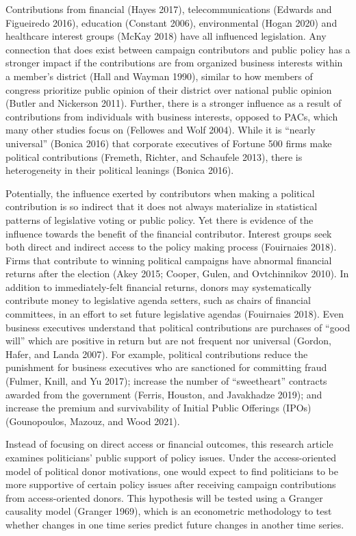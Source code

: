\documentclass[12pt,]{article}
\begin{document}
Contributions from financial (Hayes 2017), telecommunications (Edwards
and Figueiredo 2016), education (Constant 2006), environmental (Hogan
2020) and healthcare interest groups (McKay 2018) have all influenced
legislation. Any connection that does exist between campaign
contributors and public policy has a stronger impact if the
contributions are from organized business interests within a member's
district (Hall and Wayman 1990), similar to how members of congress
prioritize public opinion of their district over national public opinion
(Butler and Nickerson 2011). Further, there is a stronger influence as a
result of contributions from individuals with business interests,
opposed to PACs, which many other studies focus on (Fellowes and Wolf
2004). While it is ``nearly universal'' (Bonica 2016) that corporate
executives of Fortune 500 firms make political contributions (Fremeth,
Richter, and Schaufele 2013), there is heterogeneity in their political
leanings (Bonica 2016).

Potentially, the influence exerted by contributors when making a
political contribution is so indirect that it does not always
materialize in statistical patterns of legislative voting or public
policy. Yet there is evidence of the influence towards the benefit of
the financial contributor. Interest groups seek both direct and indirect
access to the policy making process (Fouirnaies 2018). Firms that
contribute to winning political campaigns have abnormal financial
returns after the election (Akey 2015; Cooper, Gulen, and Ovtchinnikov
2010). In addition to immediately-felt financial returns, donors may
systematically contribute money to legislative agenda setters, such as
chairs of financial committees, in an effort to set future legislative
agendas (Fouirnaies 2018). Even business executives understand that
political contributions are purchases of ``good will'' which are
positive in return but are not frequent nor universal (Gordon, Hafer,
and Landa 2007). For example, political contributions reduce the
punishment for business executives who are sanctioned for committing
fraud (Fulmer, Knill, and Yu 2017); increase the number of
``sweetheart'' contracts awarded from the government (Ferris, Houston,
and Javakhadze 2019); and increase the premium and survivability of
Initial Public Offerings (IPOs) (Gounopoulos, Mazouz, and Wood 2021).

Instead of focusing on direct access or financial outcomes, this
research article examines politicians' public support of policy issues.
Under the access-oriented model of political donor motivations, one
would expect to find politicians to be more supportive of certain policy
issues after receiving campaign contributions from access-oriented
donors. This hypothesis will be tested using a Granger causality model
(Granger 1969), which is an econometric methodology to test whether
changes in one time series predict future changes in another time
series.
\end{document}
